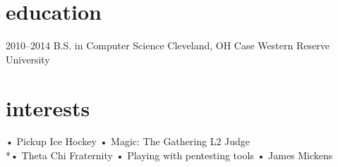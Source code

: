 \documentclass[]{friggeri-cv}
\begin{document}
\section{education}

\begin{entrylist}
  \entry
    {2010–2014}
    {B.S. in Computer Science}
    {Cleveland, OH}
    {Case Western Reserve University}
\end{entrylist}

\section{interests}
•	Pickup Ice Hockey
•	Magic: The Gathering L2 Judge
\\*•	Theta Chi Fraternity
•	Playing with pentesting tools
•	James Mickens
% 
\end{document}
